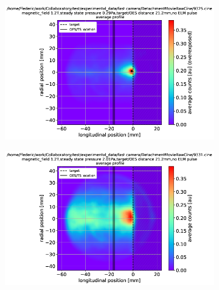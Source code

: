 \begin{figure}
     \centering
     \begin{subfigure}{0.35\textwidth}
         \centering
         \vspace*{-0mm}
         \includegraphics[width=\textwidth,trim={26 0 17 11},clip]{Chapters/chapter3/figs/fast_camera_9325.cine.png}
         \vspace*{-17mm}
         {\color{white}\caption{\phantom{weww}}\label{fig:SSa}}
     \end{subfigure}
     \hfill
     \begin{subfigure}{0.31\textwidth}
         \centering
         \vspace*{-0mm}
         \includegraphics[width=\textwidth,trim={39 0 17 11},clip]{Chapters/chapter3/figs/fast_camera_9331.cine.png}
         \vspace*{-17mm}
         {\color{white}\caption{\phantom{wewwwww}}\label{fig:SSb}}

\end{subfigure}
\end{figure}
